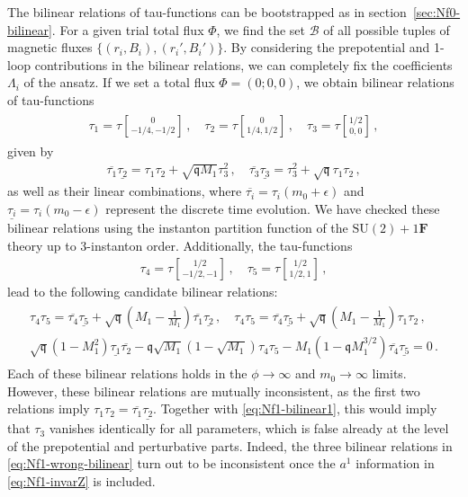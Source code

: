 \documentclass[11pt, a4paper]{article}
\newcommand{\tauftn}[2]{\tau\genfrac[]{0pt}{1}{#1}{#2}}
\theoremstyle{definition}
\begin{document}
The bilinear relations of tau-functions can be bootstrapped as in section~\ref{sec:Nf0-bilinear}. For a given trial total flux $ \Phi $, we find the set $ \mathcal{B} $ of all possible tuples of magnetic fluxes $ \{(r_i,B_i), (r_i', B_i')\} $. By considering the prepotential and 1-loop contributions in the bilinear relations, we can completely fix the coefficients $ \Lambda_i $ of the ansatz. If we set a total flux $ \Phi=(0;0,0) $, we obtain bilinear relations of tau-functions
\begin{gather}
    \begin{gathered}\label{eq:Nf1-tau}
        \tau_1 = \tauftn{0}{-1/4,-1/2} \, , \quad
        \tau_2 = \tauftn{0}{1/4, 1/2} \, , \quad
        \tau_3 = \tauftn{1/2}{0,0} \, , 
    \end{gathered}
\end{gather}
given by
\begin{align}\label{eq:Nf1-bilinear1}
    \overline{\tau_1} \underline{\tau_2} = \tau_1 \tau_2 + \sqrt{\mathfrak{q}{M_1}} \tau_3^2 \, , \quad
    \overline{\tau_3} \underline{\tau_3} = \tau_3^2 + \sqrt{\mathfrak{q}} \tau_1 \tau_2 \, ,
\end{align}
as well as their linear combinations, where $ \overline{\tau_i} = \tau_i(m_0+\epsilon) $ and $ \underline{\tau_i} = \tau_i(m_0-\epsilon) $ represent the discrete time evolution. We have checked these bilinear relations using the instanton partition function of the $ \mathrm{SU}(2)+1\mathbf{F} $ theory up to 3-instanton order. Additionally, the tau-functions 
\begin{align}
    \tau_4 = \tauftn{1/2}{-1/2, -1} \, , \quad
    \tau_5 = \tauftn{1/2}{1/2, 1} \, ,
\end{align}
lead to the following candidate bilinear relations:
\begin{align}
    \begin{aligned}\label{eq:Nf1-wrong-bilinear}
        \tau_4 \tau_5 = \overline{\tau_4} \underline{\tau_5} + \sqrt{\mathfrak{q}} \left( M_1 - \frac{1}{M_1} \right) \overline{\tau_1} \underline{\tau_2} \, , \quad
        \tau_4 \tau_5 = \overline{\tau_4} \underline{\tau_5} + \sqrt{\mathfrak{q}} \left( M_1 - \frac{1}{M_1} \right) \tau_1 \tau_2 \, , \\
        \sqrt{\mathfrak{q}} (1-M_1^2) \underline{\tau_1} \overline{\tau_2} - \mathfrak{q}\sqrt{M_1} (1-\sqrt{M_1}) \tau_4 \tau_5 - M_1 (1-\mathfrak{q}M_1^{3/2}) \overline{\tau_4} \underline{\tau_5} = 0 \, .
    \end{aligned}
\end{align}
Each of these bilinear relations holds in the $ \phi \to \infty $ and $ m_0 \to \infty $ limits. However, these bilinear relations are mutually inconsistent, as the first two relations imply $ \tau_1\tau_2=\overline{\tau_1}\underline{\tau_2} $. Together with \eqref{eq:Nf1-bilinear1}, this would imply that $ \tau_3 $ vanishes identically for all parameters, which is false already at the level of the prepotential and perturbative parts. Indeed, the three bilinear relations in \eqref{eq:Nf1-wrong-bilinear} turn out to be inconsistent once the $ a^1 $ information in \eqref{eq:Nf1-invarZ} is included.
\end{document}
